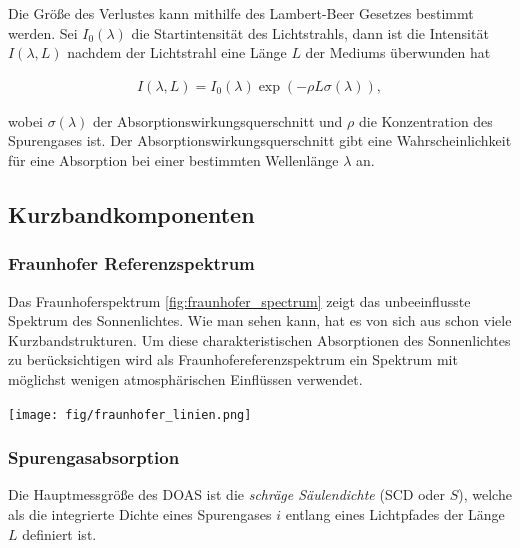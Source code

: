 \documentclass[12pt, a4paper, bibliography=totoc]{scrartcl}
\begin{document}
\begin{multicols}{2}
Die Größe des Verlustes kann mithilfe des Lambert-Beer Gesetzes bestimmt werden.
Sei $I_0 (\lambda)$ die Startintensität des Lichtstrahls, dann ist die Intensität $I(\lambda, L)$ nachdem der Lichtstrahl eine Länge $L$ der Mediums überwunden hat
    
\begin{align}
    I(\lambda, L) = I_0 (\lambda) \exp \left( - \rho L \sigma (\lambda)\right) ,\label{eq:lambert_beer_law}
\end{align}

wobei $\sigma (\lambda)$ der Absorptionswirkungsquerschnitt und $\rho$ die Konzentration des Spurengases ist.
Der Absorptionswirkungsquerschnitt gibt eine Wahrscheinlichkeit für eine Absorption bei einer bestimmten Wellenlänge $\lambda$ an.

\subsection{Kurzbandkomponenten}\label{ssec:Kurzband}

\subsubsection{Fraunhofer Referenzspektrum}\label{sssec:fraunhofer_reference}

Das Fraunhoferspektrum \ref{fig:fraunhofer_spectrum} zeigt das unbeeinflusste Spektrum des Sonnenlichtes. 
Wie man sehen kann, hat es von sich aus schon viele Kurzbandstrukturen.
Um diese charakteristischen Absorptionen des Sonnenlichtes zu berücksichtigen wird als Fraunhofereferenzspektrum ein Spektrum mit möglichst wenigen atmosphärischen Einflüssen verwendet.

\begin{center}
    \texttt{[image: fig/fraunhofer\_linien.png]}
    \label{fig:fraunhofer_spectrum}
\end{center}



\subsubsection{Spurengasabsorption}\label{sssec:trace_gas_absorption}

Die Hauptmessgröße des DOAS ist die \textit{schräge Säulendichte} (SCD oder $S$),
welche als die integrierte Dichte eines Spurengases $i$ entlang eines Lichtpfades der Länge $L$ definiert ist.
    

\end{multicols}
\end{document}
